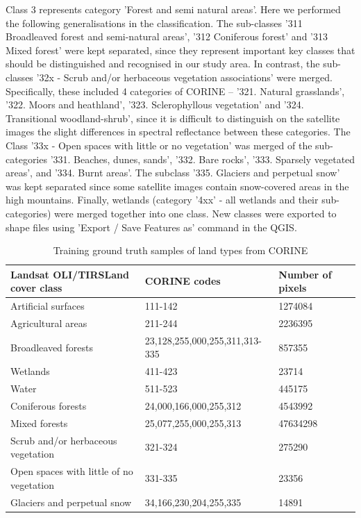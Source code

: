 \documentclass[remotesensing,article,submit,pdftex,moreauthors]{Definitions/mdpi}
\begin{document}
{Class 3 represents} category 'Forest and semi natural areas'. Here we performed the following generalisations in the classification. The sub-classes '311 Broadleaved forest and semi-natural areas', '312 Coniferous forest' and '313 Mixed forest' were kept separated, since they represent important key classes that should be {distinguished and recognised in our study area}. In contrast, the sub-classes '32x - Scrub and/or herbaceous vegetation associations' were merged. Specifically, these included 4 categories of CORINE -- '321. Natural grasslands', '322. Moors and heathland', '323. Sclerophyllous vegetation' and '324. Transitional woodland-shrub', since it is difficult to distinguish on the satellite images the slight differences in spectral reflectance between these categories. The Class '33x - Open spaces with little or no vegetation' was merged of the sub-categories '331. Beaches, dunes, sands', '332. Bare rocks', '333. Sparsely vegetated areas', and '334. Burnt areas'. The subclass '335. Glaciers and perpetual snow' was kept separated since some satellite {images contain snow-covered areas} in the high mountains. {Finally, wetlands (category '4xx' - all wetlands and their sub-categories) were merged together into one class. New classes were exported to shape files using 'Export / Save Features as' command in the QGIS}.

\begin{table}[h]
\caption{Training ground truth samples of land types from CORINE}\label{tabcor}%
\begin{tabular}{@{}llll@{}}
\toprule
Landsat OLI/TIRS\footnotemark[1] Land cover class & CORINE codes & Number of pixels  \\
\midrule
        Artificial surfaces & 111-142 & 1274084 \\ \hline
        Agricultural areas & 211-244 & 2236395  \\ \hline
        Broadleaved forests & 23,128,255,000,255,311,313-335 & 857355  \\ \hline
        Wetlands & 411-423 & 23714  \\ \hline
	Water & 511-523 & 445175  \\ \hline
        Coniferous forests & 24,000,166,000,255,312 & 4543992  \\ \hline
        Mixed forests & 25,077,255,000,255,313 & 47634298  \\ \hline
        Scrub and/or herbaceous vegetation & 321-324 & 275290  \\ \hline
        Open spaces with little of no vegetation & 331-335 & 23356  \\ \hline
        Glaciers and perpetual snow & 34,166,230,204,255,335 & 14891  \\ \hline
\bottomrule
\end{tabular}
\end{table}
\end{document}
